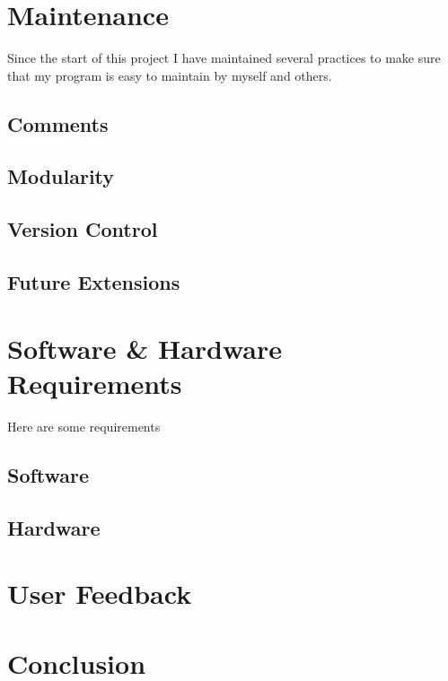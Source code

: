 \documentclass[../../../main.tex]{subfiles}
\begin{document}
\section{Maintenance}
Since the start of this project I have maintained several practices to make sure that my program is easy to maintain by myself and others.
\subsection{Comments}

\subsection{Modularity}

\subsection{Version Control}

\subsection{Future Extensions}

\section{Software \& Hardware Requirements}
Here are some requirements 
\subsection{Software}

\subsection{Hardware}

\section{User Feedback}

\section{Conclusion}

\newpage
\end{document}
